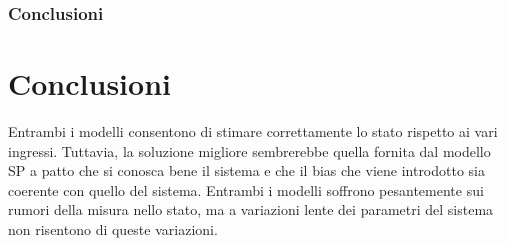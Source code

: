 \documentclass{beamer}
\begin{document}
\begin{frame}
    \frametitle{Conclusioni}
    \section{Conclusioni}
    Entrambi i modelli consentono di stimare correttamente lo stato rispetto ai vari ingressi. Tuttavia, la soluzione migliore sembrerebbe quella fornita dal modello SP a patto che si conosca bene il sistema e che il bias che viene introdotto sia coerente con quello del sistema.\newline
    Entrambi i modelli soffrono pesantemente sui rumori della misura nello stato, ma a variazioni lente dei parametri del sistema non risentono di queste variazioni.
\end{frame}
\end{document}
